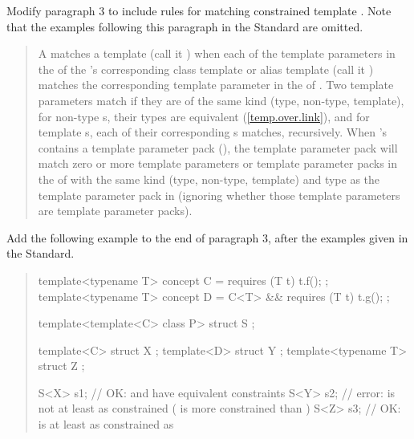 Modify paragraph 3 to include rules for matching constrained template 
. Note that the examples following this 
paragraph in the \Cpp Standard are omitted.

\begin{quote}
\setcounter{Paras}{2}
\pnum
A  matches  a template 
  (call it ) when each of the 
template parameters in the  of the 
's corresponding class template or alias 
template (call it  ) matches the corresponding template parameter in 
the  of .
% 
Two template parameters match if they are of the same kind (type, non-type, 
template), for non-type s, their types are 
equivalent (\ref{temp.over.link}), and for template 
s, each of their corresponding
s matches, recursively. 
% 
When 's  
contains a template parameter pack (), the template 
parameter pack will match zero or more template parameters or template 
parameter packs in the  of
 with the same kind (type, non-type, template) and type as the template 
parameter pack in  (ignoring whether those template parameters are
template parameter packs).
\end{quote}

Add the following example to the end of paragraph 3, after the
examples given in the \Cpp Standard.

\begin{quote}
\begin{addedblock}
\enterexample
\begin{codeblock}
template<typename T> concept C = requires (T t) { t.f(); };
template<typename T> concept D = C<T> && requires (T t) { t.g(); };

template<template<C> class P>
  struct S { };

template<C> struct X { };
template<D> struct Y { };
template<typename T> struct Z { };

S<X> s1; // OK:  and  have equivalent constraints
S<Y> s2; // error:  is not at least as constrained  ( is more constrained than )
S<Z> s3; // OK:  is at least as constrained as 
\end{codeblock}
\exitexample
\end{addedblock}
\end{quote}


